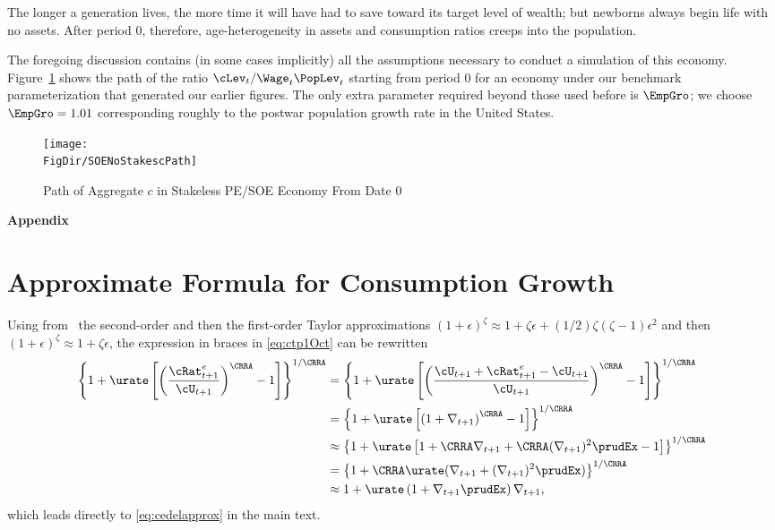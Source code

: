 \documentclass{\handout}
\begin{document}
The longer a generation lives, the more time it will have had to save toward
its target level of wealth; but newborns always begin life with no assets.  After period 0, therefore, age-heterogeneity in assets and consumption ratios creeps into the population.

The foregoing discussion contains (in some cases implicitly) all the
assumptions necessary to conduct a simulation of this economy.
Figure~\ref{fig:SOENoStakescPath} shows the path of the ratio $\cLev_{t}/\Wage_{t}\PopLev_{t}$ starting from
period 0 for an economy under our benchmark parameterization that generated
our earlier figures.  The
only extra parameter required beyond those used before is $\EmpGro$; we choose $\EmpGro=1.01$ corresponding
roughly to the postwar population growth rate in the United States.

\begin{figure}
\caption{Path of Aggregate $c$ in Stakeless PE/SOE Economy From Date 0}
\texttt{[image: \\FigDir/SOENoStakescPath]}
\label{fig:SOENoStakescPath}
\end{figure}



\label{sec:PFwhenFHWfails}
\pagebreak\appendix
\centerline{\bf \LARGE Appendix}\medskip

\setcounter{section}{0}

\section{Approximate Formula for Consumption Growth}\label{sec:CGroApprox}

Using from \MathFactsList ~the second-order and then the first-order
Taylor approximations  \TaylorTwo $(1+\epsilon)^{\zeta} \approx 1 + \zeta \epsilon +
(1/2)\zeta(\zeta-1) \epsilon^{2}$ and then \TaylorOne $(1+\epsilon)^{\zeta} \approx 1 + \zeta \epsilon$, the expression in braces
in \eqref{eq:ctp1Oct} can be rewritten
\begin{equation}\begin{gathered}\begin{aligned}
        \left\{1+\urate\left[\left(\frac{{\cRat}^{e}_{t+1}}{\cU_{t+1}}\right)^{\CRRA}-1\right]\right\}^{1/\CRRA} & =  \left\{1+\urate\left[\left(\frac{\cU_{t+1}+{\cRat}^{e}_{t+1}-\cU_{t+1}}{\cU_{t+1}}\right)^{\CRRA}-1\right]\right\}^{1/\CRRA} \notag
\\      & =  \left\{1+\urate\left[\left(1+\nabla _{t+1}\right)^{\CRRA}-1\right]\right\}^{1/\CRRA} \notag
\\      & \approx       \left\{1+\urate\left[1+\CRRA \nabla _{t+1}+ \CRRA (\nabla _{t+1})^{2}\prudEx-1\right]\right\}^{1/\CRRA} \notag 
\\ & =          \left\{1+ \CRRA \urate (\nabla _{t+1}+ (\nabla _{t+1})^{2}\prudEx)\right\}^{1/\CRRA} \notag
\\ & \approx  1+ \urate  \left(1+\nabla _{t+1}\prudEx\right)\nabla _{t+1}, \notag
\end{aligned}\end{gathered}\end{equation}
which leads directly to \eqref{eq:cedelapprox} in the main text.
\end{document}
